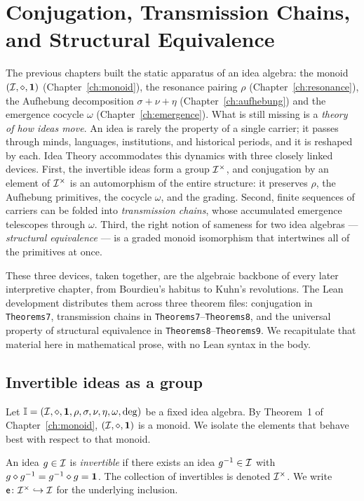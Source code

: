 \chapter{Conjugation, Transmission Chains, and Structural Equivalence}\label{ch:conjugation}

The previous chapters built the static apparatus of an idea algebra: the
monoid $(\mathcal{I},\mathbin{\diamond},\mathbf{1})$ (Chapter~\ref{ch:monoid}), the resonance pairing $\rho$
(Chapter~\ref{ch:resonance}), the Aufhebung decomposition
$\sigma+\nu+\eta$ (Chapter~\ref{ch:aufhebung}) and the emergence cocycle
$\omega$ (Chapter~\ref{ch:emergence}). What is still missing is a
\emph{theory of how ideas move}. An idea is rarely the property of a
single carrier; it passes through minds, languages, institutions, and
historical periods, and it is reshaped by each. Idea Theory accommodates
this dynamics with three closely linked devices. First, the invertible
ideas form a group $\mathcal{I}^{\times}$, and conjugation by an element of
$\mathcal{I}^{\times}$ is an automorphism of the entire structure: it
preserves $\rho$, the Aufhebung primitives, the cocycle $\omega$, and the
grading. Second, finite sequences of carriers can be folded into
\emph{transmission chains}, whose accumulated emergence telescopes
through $\omega$. Third, the right notion of sameness for two idea
algebras --- \emph{structural equivalence} --- is a graded monoid
isomorphism that intertwines all of the primitives at once.

These three devices, taken together, are the algebraic backbone of every
later interpretive chapter, from Bourdieu's habitus to Kuhn's
revolutions. The Lean development distributes them across three theorem
files: conjugation in \texttt{Theorems7}, transmission chains in
\texttt{Theorems7}--\texttt{Theorems8}, and the universal property of
structural equivalence in \texttt{Theorems8}--\texttt{Theorems9}. We
recapitulate that material here in mathematical prose, with no Lean
syntax in the body.

\section{Invertible ideas as a group}\label{sec:invertibles}

Let $\mathbb{I} = (\mathcal{I},\mathbin{\diamond},\mathbf{1},\rho,\sigma,\nu,\eta,\omega,\deg)$
be a fixed idea algebra. By Theorem~1 of Chapter~\ref{ch:monoid},
$(\mathcal{I},\mathbin{\diamond},\mathbf{1})$ is a monoid. We isolate the elements that
behave best with respect to that monoid.

\begin{definition}\label{def:invertible}
An idea $g\in\mathcal{I}$ is \emph{invertible} if there exists an idea
$g^{-1}\in\mathcal{I}$ with $g\mathbin{\diamond} g^{-1} = g^{-1}\mathbin{\diamond} g = \mathbf{1}$. The
collection of invertibles is denoted $\mathcal{I}^{\times}$. We write
$\mathsf{e}\colon \mathcal{I}^{\times}\hookrightarrow\mathcal{I}$ for the
underlying inclusion.
\end{definition}

